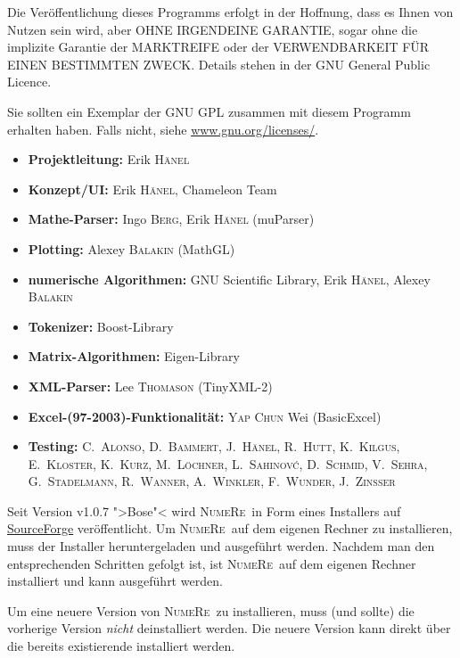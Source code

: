 \documentclass[DIV=14,headsepline,footsepline]{scrbook}
\newcommand{\NR}{\textsc{Nu\-me\-Re}}
\begin{document}
			Die Veröffentlichung dieses Programms erfolgt in der Hoffnung, dass es Ihnen von Nutzen sein wird, aber OHNE IRGENDEINE GARANTIE, sogar ohne die implizite Garantie der MARKTREIFE oder der VERWENDBARKEIT FÜR EINEN BESTIMMTEN ZWECK. Details stehen in der GNU General Public Licence.
			
			Sie sollten ein Exemplar der GNU GPL zusammen mit diesem Programm erhalten haben. Falls nicht, siehe \href{http://www.gnu.org/licenses/}{www.gnu.org/licenses/}.
			\begin{itemize}
				\item \textbf{Projektleitung:} Erik \textsc{Hänel}
				\item \textbf{Konzept/UI:} Erik \textsc{Hänel}, Chameleon Team
				\item \textbf{Mathe-Parser:} Ingo \textsc{Berg}, Erik \textsc{Hänel} (muParser)
				\item \textbf{Plotting:} Alexey \textsc{Balakin} (MathGL)
				\item \textbf{numerische Algorithmen:} GNU Scientific Library, Erik \textsc{Hänel}, Alexey \textsc{Balakin}
				\item \textbf{Tokenizer:} Boost-Library
				\item \textbf{Matrix-Algorithmen:} Eigen-Library
				\item \textbf{XML-Parser:} Lee \textsc{Thomason} (TinyXML-2)
				\item \textbf{Excel-(97-2003)-Funktionalität:} \textsc{Yap Chun} Wei (BasicExcel)
				\item \textbf{Testing:} C.~\textsc{Alonso}, D.~\textsc{Bammert}, J.~\textsc{Hänel}, R.~\textsc{Hutt}, K.~\textsc{Kilgus}, E.~\textsc{Kloster}, K.~\textsc{Kurz}, M.~\textsc{Löchner}, L.~\textsc{Sahinov\'c}, D.~\textsc{Schmid}, V.~\textsc{Sehra}, G.~\textsc{Stadelmann}, R.~\textsc{Wanner}, A.~\textsc{Winkler}, F.~\textsc{Wunder}, J.~\textsc{Zinßer}
			\end{itemize}
		Seit Version v1.0.7 ">Bose"< wird \NR\ in Form eines Installers auf \href{https://sourceforge.net/projects/numere/files/latest/download}{SourceForge} veröffentlicht. Um \NR\ auf dem eigenen Rechner zu installieren, muss der Installer heruntergeladen und ausgeführt werden. Nachdem man den entsprechenden Schritten gefolgt ist, ist \NR\ auf dem eigenen Rechner installiert und kann ausgeführt werden.
		
		Um eine neuere Version von \NR\ zu installieren, muss (und sollte) die vorherige Version \emph{nicht} deinstalliert werden. Die neuere Version kann direkt über die bereits existierende installiert werden.
\end{document}

